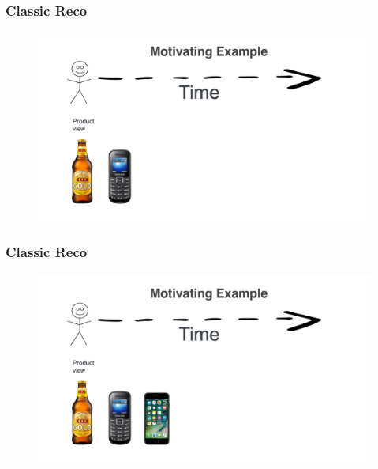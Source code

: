 \begin{frame}
  \frametitle{Classic Reco}
 
 
   \begin{figure}[h!]
     \includegraphics[scale=0.25]{images/mot_ex1b.png}
       \centering
       \label{motex1}
   \end{figure}
     
 \end{frame}


\begin{frame}
  \frametitle{Classic Reco}
 
 
   \begin{figure}[h!]
     \includegraphics[scale=0.25]{images/mot_ex1cc.png}
       \centering
       \label{motex1}
   \end{figure}
     
 \end{frame}




